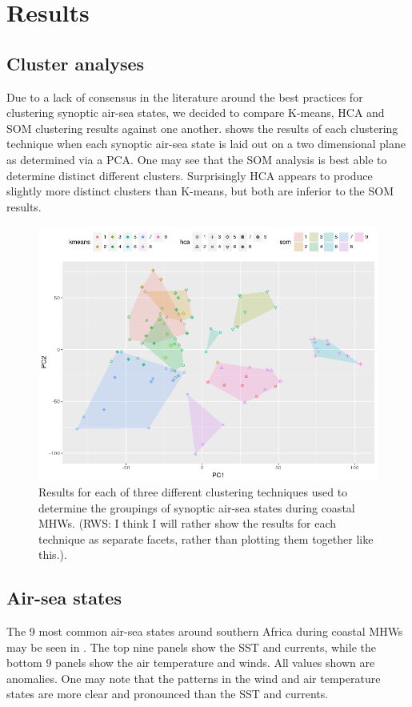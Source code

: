 \documentclass[a4paper,10pt,review]{elsarticle}
\begin{document}
\section{Results}
\subsection{Cluster analyses}
Due to a lack of consensus in the literature around the best practices for clustering synoptic air-sea states, we decided to compare K-means, HCA and SOM clustering results against one another.  shows the results of each clustering technique when each synoptic air-sea state is laid out on a two dimensional plane as determined via a PCA. One may see that the SOM analysis is best able to determine distinct different clusters. Surprisingly HCA appears to produce slightly more distinct clusters than K-means, but both are inferior to the SOM results.

\begin{figure}
\includegraphics[width=1.0\textwidth]{figure_3.png}
\caption{Results for each of three different clustering techniques used to determine the groupings of synoptic air-sea states during coastal MHWs. (RWS: I think I will rather show the results for each technique as separate facets, rather than plotting them together like this.).}
\label{figure3}
\end{figure}

\subsection{Air-sea states}
The 9 most common air-sea states around southern Africa during coastal MHWs may be seen in . The top nine panels show the SST and currents, while the bottom 9 panels show the air temperature and winds. All values shown are anomalies. One may note that the patterns in the wind and air temperature states are more clear and pronounced than the SST and currents.
\end{document}
